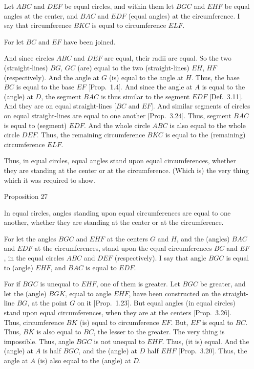 Let $ABC$ and $DEF$ be equal circles, and within them let $BGC$ and $EHF$ be equal angles at the center, and $BAC$ and $EDF$ (equal angles) at the circumference. I say that circumference $BKC$ is equal to circumference $ELF$.

For let $BC$ and $EF$ have been joined.

And since circles $ABC$ and $DEF$ are equal, their radii are equal.
So the two (straight-lines) $BG$, $GC$ (are) equal to the two (straight-lines)
$EH$, $HF$ (respectively). And the angle at $G$ (is) equal to the angle at $H$.
Thus, the base $BC$ is equal to the base $EF$ [Prop.~1.4].
And since the angle at $A$ is equal to the (angle) at $D$, the segment $BAC$ is
thus similar to the segment $EDF$ [Def.~3.11]. And they are on
equal straight-lines [$BC$ and $EF$]. And similar segments of circles on equal
straight-lines are equal to one another [Prop.~3.24]. Thus, segment
$BAC$ is equal to (segment) $EDF$. And the whole circle $ABC$ is also
equal to the whole circle $DEF$. Thus, the remaining circumference $BKC$
is equal to the (remaining) circumference $ELF$.

Thus,   in equal circles, equal angles stand upon equal circumferences, whether they
are standing  at the center or at the circumference. (Which is)
the very thing which it was required to show.


\begin{center}
{\large Proposition 27}
\end{center}

In equal circles, angles standing upon equal circumferences  are equal to one
another, whether they are standing at the center or at the circumference.

\epsfysize=1.5in
\centerline{}

For let the angles $BGC$ and $EHF$ at the centers $G$ and $H$, and the (angles) $BAC$ and $EDF$
at the circumferences, stand upon the equal circumferences $BC$ and $EF$, in the equal circles $ABC$ and $DEF$ (respectively). I say that angle $BGC$ is
equal to (angle) $EHF$, and $BAC$ is equal to $EDF$.

For if $BGC$ is unequal to $EHF$, one of them is greater. Let $BGC$ be greater, 
and let the (angle) $BGK$, equal to  angle $EHF$, have been constructed on the
straight-line $BG$, at the point $G$ on it [Prop.~1.23]. But equal angles (in equal circles) stand upon equal circumferences, when they are at the centers [Prop.~3.26]. Thus,
circumference $BK$ (is) equal to circumference $EF$. But, $EF$ is equal to $BC$.
Thus, $BK$ is also equal to $BC$, the lesser to the greater. The very thing is
impossible. Thus, angle $BGC$ is not unequal to $EHF$. Thus, (it is) equal.
And the (angle) at $A$ is half $BGC$, and the (angle) at $D$ half $EHF$ [Prop.~3.20]. Thus, the angle at $A$ (is) also equal to the (angle) at $D$.

